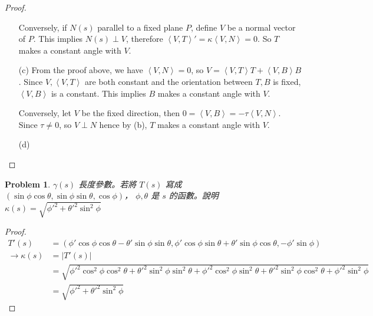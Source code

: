 \documentclass[10pt,a4paper]{article}
\newcounter{theProblemCounter}
\newtheorem{problem}[theProblemCounter]{Problem}
\begin{document}
\begin{proof}
\begin{enumerate}
Conversely, if $N(s)$ parallel to a fixed plane $P$, define $V$ be a normal vector of $P$. This implies $N(s)\perp V$, therefore $\left\langle V, T\right\rangle' = \kappa\left\langle V, N\right\rangle = 0$. So $T$ makes a constant angle with $V$.
\item[(c)]
From the proof above, we have $\left\langle V, N\right\rangle = 0$, so $V = \left\langle V, T\right\rangle T + \left\langle V, B\right\rangle B$. Since $V, \left\langle V, T\right\rangle$ are both constant and the orientation between $T, B$ is fixed, $\left\langle V, B\right\rangle$ is a constant. This implies $B$ makes a constant angle with $V$.

Conversely, let $V$ be the fixed direction, then $0=\left\langle V, B\right\rangle = -\tau\left\langle V, N\right\rangle$. Since $\tau\ne 0$, so $V\perp N$ hence by (b), $T$ makes a constant angle with $V$.
\item[(d)]
\end{enumerate}
\end{proof}

\setcounter{theProblemCounter}{5}
\begin{problem}
$\gamma(s)$ 長度參數。若將 $T(s)$ 寫成 $(\sin\phi\cos\theta, \sin\phi\sin\theta, \cos\phi)$， $\phi,\theta$ 是 $s$ 的函數。說明 $\kappa(s)=\sqrt{\phi'^2+\theta'^2\sin^2\phi}$
\end{problem}
\begin{proof}
\begin{align*}
T'(s)&=(\phi'\cos\phi\cos\theta-\theta'\sin\phi\sin\theta,\phi'\cos\phi\sin\theta+\theta'\sin\phi\cos\theta,-\phi'\sin\phi)\\
\rightarrow\kappa(s)&=\left|T'(s)\right|\\
&=\sqrt{\phi'^2\cos^2\phi\cos^2\theta+\theta'^2\sin^2\phi\sin^2\theta+\phi'^2\cos^2\phi\sin^2\theta+\theta'^2\sin^2\phi\cos^2\theta+\phi'^2\sin^2\phi}\\
&=\sqrt{\phi'^2+\theta'^2\sin^2\phi}
\end{align*}
\end{proof}
\end{document}
